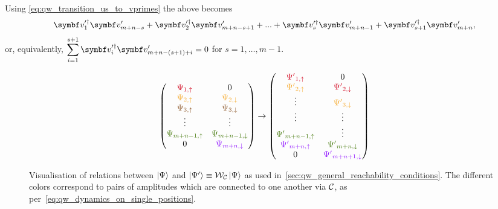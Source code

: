 Using \cref{eq:qw_transition_us_to_vprimes} the above becomes
\begin{equation*}
	\bs v^{\prime\dagger}_1 \bs v^\prime_{m+n-s} +
	\bs v^{\prime\dagger}_2 \bs v^\prime_{m+n-s+1} +
	... +
    \bs v^{\prime\dagger}_{s} \bs v^\prime_{m+n-1} +
	\bs v^{\prime\dagger}_{s+1} \bs v^\prime_{m+n},
\end{equation*}
or, equivalently,
$\displaystyle \sum_{i=1}^{s+1} \bs v^{\prime\dagger}_i \bs v^\prime_{m+n-(s+1)+i}=0$
for $s=1,\dots,m-1$.

\begin{figure}[tbh]
    \centering
    \begin{equation*}
    \begin{pmatrix}
    \textcolor[rgb]{0.82,0.01,0.11}{\Psi _{1,\uparrow }} & 0\\
    \textcolor[rgb]{0.96,0.65,0.14}{\Psi _{2,\uparrow }} & \textcolor[rgb]{0.96,0.65,0.14}{\Psi }\textcolor[rgb]{0.96,0.65,0.14}{_{2,\downarrow }}\\
    \textcolor[rgb]{0.55,0.34,0.16}{\Psi _{3,\uparrow }} & \textcolor[rgb]{0.55,0.34,0.16}{\Psi }\textcolor[rgb]{0.55,0.34,0.16}{_{3,\downarrow }}\\
    \vdots  & \vdots \\
    \textcolor[rgb]{0.25,0.46,0.02}{\Psi _{m+n-1,\uparrow }} & \textcolor[rgb]{0.25,0.46,0.02}{\Psi }\textcolor[rgb]{0.25,0.46,0.02}{_{m+n-1,\downarrow }}\\
    0 & \textcolor[rgb]{0.56,0.07,1}{\Psi }\textcolor[rgb]{0.56,0.07,1}{_{m+n,\downarrow }}
    \end{pmatrix}\rightarrow \begin{pmatrix}
    \textcolor[rgb]{0.82,0.01,0.11}{\Psi '}\textcolor[rgb]{0.82,0.01,0.11}{_{1,\uparrow }} & 0\\
    \textcolor[rgb]{0.96,0.65,0.14}{\Psi '}\textcolor[rgb]{0.96,0.65,0.14}{_{2,\uparrow }} & \textcolor[rgb]{0.82,0.01,0.11}{\Psi '}\textcolor[rgb]{0.82,0.01,0.11}{_{2,\downarrow }}\\
    \vdots  & \textcolor[rgb]{0.96,0.65,0.14}{\Psi '}\textcolor[rgb]{0.96,0.65,0.14}{_{3,\downarrow }}\\
    \vdots  & \vdots \\
    \textcolor[rgb]{0.25,0.46,0.02}{\Psi '}\textcolor[rgb]{0.25,0.46,0.02}{_{m+n-1,\uparrow }} & \vdots \\
    \textcolor[rgb]{0.56,0.07,1}{\Psi '}\textcolor[rgb]{0.56,0.07,1}{_{m+n,\uparrow }} & \textcolor[rgb]{0.25,0.46,0.02}{\Psi '}\textcolor[rgb]{0.25,0.46,0.02}{_{m+n,\downarrow }}\\
    0 & \textcolor[rgb]{0.56,0.07,1}{\Psi '}\textcolor[rgb]{0.56,0.07,1}{_{m+n+1,\downarrow }}
    \end{pmatrix}
    \end{equation*}
    \caption{
        Visualisation of relations between $\ket\Psi$ and $\ket{\Psi'}\equiv{\mathcal{W}}_{\mathcal{C}}\ket\Psi$ as used in~\cref{sec:qw_general_reachability_conditions}. The different colors correspond to pairs of amplitudes which are connected to one another via ${\mathcal{C}}$, as per~\cref{eq:qw_dynamics_on_single_positions}.
    }
    \label{fig:qw_visualisation_PsiVsPsip}
\end{figure}

